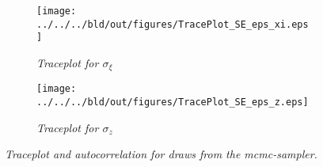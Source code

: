 \begin{figure}[h]
  \begin{subfigure}{.5\textwidth}
    \centering
    \texttt{[image: ../../../bld/out/figures/TracePlot\_SE\_eps\_xi.eps]}
    \caption{\textit{Traceplot for \(\sigma_{\xi}\)}}
    \label{fig:sig_traceplot}
  \end{subfigure}
  \begin{subfigure}{.5\textwidth}
    \centering
    \texttt{[image: ../../../bld/out/figures/TracePlot\_SE\_eps\_z.eps]}
    \caption{\textit{Traceplot for \(\sigma_{z}\)}}
    \label{fig:tfp_traceplot}
  \end{subfigure}
  \caption{\textit{Traceplot and autocorrelation for draws from the
      mcmc-sampler.}}
  \label{fig:convergence_eps_xi}
\end{figure}

